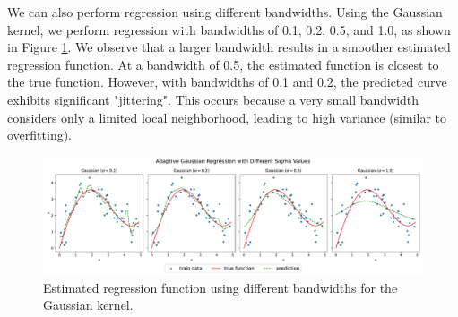 \documentclass{article}
\begin{document}
We can also perform regression using different bandwidths. Using the Gaussian kernel, we perform regression with bandwidths of 0.1, 0.2, 0.5, and 1.0, as shown in Figure \ref{fig:adaptive_gaussian}. We observe that a larger bandwidth results in a smoother estimated regression function. At a bandwidth of 0.5, the estimated function is closest to the true function. However, with bandwidths of 0.1 and 0.2, the predicted curve exhibits significant "jittering". This occurs because a very small bandwidth considers only a limited local neighborhood, leading to high variance (similar to overfitting).

\begin{figure}[H]
    \centering
    \includegraphics[width=\textwidth]{results/adaptive_gaussian_regression.pdf}
    \caption{Estimated regression function using different bandwidths for the Gaussian kernel.}
    \label{fig:adaptive_gaussian}
\end{figure}



\end{document}
